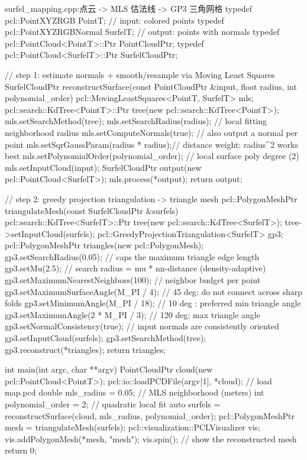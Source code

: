\begin{codebox}[C++]{surfel\_mapping.cpp:点云 -> MLS 估法线 -> GP3 三角网格}
typedef pcl::PointXYZRGB        PointT;        // input: colored points
typedef pcl::PointXYZRGBNormal  SurfelT;       // output: points with normals
typedef pcl::PointCloud<PointT>::Ptr   PointCloudPtr;
typedef pcl::PointCloud<SurfelT>::Ptr  SurfelCloudPtr;

// step 1: estimate normals + smooth/resample via Moving Least Squares
SurfelCloudPtr reconstructSurface(const PointCloudPtr &input,
                                  float radius, int polynomial_order) {
  pcl::MovingLeastSquares<PointT, SurfelT> mls;
  pcl::search::KdTree<PointT>::Ptr tree(new pcl::search::KdTree<PointT>);
  mls.setSearchMethod(tree);
  mls.setSearchRadius(radius);          // local fitting neighborhood radius
  mls.setComputeNormals(true);          // also output a normal per point
  mls.setSqrGaussParam(radius * radius);// distance weight: radius^2 works best
  mls.setPolynomialOrder(polynomial_order);  // local surface poly degree (2)
  mls.setInputCloud(input);
  SurfelCloudPtr output(new pcl::PointCloud<SurfelT>);
  mls.process(*output);
  return output;
}

// step 2: greedy projection triangulation -> triangle mesh
pcl::PolygonMeshPtr triangulateMesh(const SurfelCloudPtr &surfels) {
  pcl::search::KdTree<SurfelT>::Ptr tree(new pcl::search::KdTree<SurfelT>);
  tree->setInputCloud(surfels);
  pcl::GreedyProjectionTriangulation<SurfelT> gp3;
  pcl::PolygonMeshPtr triangles(new pcl::PolygonMesh);
  gp3.setSearchRadius(0.05);            // caps the maximum triangle edge length
  gp3.setMu(2.5);                       // search radius = mu * nn-distance (density-adaptive)
  gp3.setMaximumNearestNeighbors(100);  // neighbor budget per point
  gp3.setMaximumSurfaceAngle(M_PI / 4); // 45 deg: do not connect across sharp folds
  gp3.setMinimumAngle(M_PI / 18);       // 10 deg : preferred min triangle angle
  gp3.setMaximumAngle(2 * M_PI / 3);    // 120 deg: max triangle angle
  gp3.setNormalConsistency(true);       // input normals are consistently oriented
  gp3.setInputCloud(surfels);
  gp3.setSearchMethod(tree);
  gp3.reconstruct(*triangles);
  return triangles;
}

int main(int argc, char **argv) {
  PointCloudPtr cloud(new pcl::PointCloud<PointT>);
  pcl::io::loadPCDFile(argv[1], *cloud);          // load map.pcd
  double mls_radius = 0.05;                        // MLS neighborhood (meters)
  int    polynomial_order = 2;                     // quadratic local fit
  auto surfels = reconstructSurface(cloud, mls_radius, polynomial_order);
  pcl::PolygonMeshPtr mesh = triangulateMesh(surfels);
  pcl::visualization::PCLVisualizer vis;
  vis.addPolygonMesh(*mesh, "mesh"); vis.spin();   // show the reconstructed mesh
  return 0;
}
\end{codebox}

